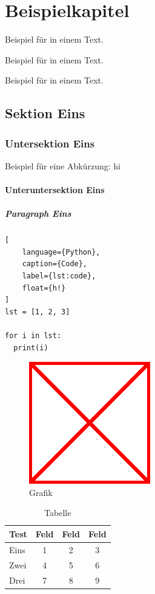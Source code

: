 \chapter{Beispielkapitel}
\label{chp:Beispielkapitel}

Beispiel für  in einem Text.

Beispiel für  in einem Text.

Beispiel für  in einem Text.

\section{Sektion Eins}
\label{sec:Sektion_Eins}

\blindtext

\subsection{Untersektion Eins}
\label{sub:Untersektion_Eins}

Beispiel für eine Abkürzung: \ac{hi}

\subsubsection{Unteruntersektion Eins}

\paragraph{Paragraph Eins}

\begin{lstlisting}[
	language={Python},
	caption={Code},
	label={lst:code},
	float={h!}
]
lst = [1, 2, 3]

for i in lst:
  print(i)
\end{lstlisting}

\begin{figure}[ht!]
	\centering
	\includegraphics[width=0.25\linewidth]{images/example-image.png}
	\caption{Grafik}
	\label{fig:grafik}
\end{figure}

\begin{table}[ht!]
	\selectfont
	\centering
	\begin{tabular}{l|ccc}
		Test & Feld & Feld & Feld \\
		\hline
		Eins & 1 & 2 & 3 \\
		Zwei & 4 & 5 & 6 \\
		Drei & 7 & 8 & 9 \\
	\end{tabular}
	\caption{Tabelle}
	\label{tab:tabelle}
\end{table}


